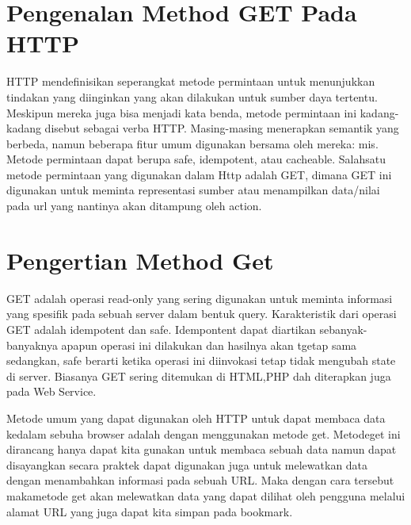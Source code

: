 
\section{Pengenalan Method GET Pada HTTP}
HTTP mendefinisikan seperangkat metode permintaan untuk menunjukkan tindakan yang diinginkan yang akan dilakukan untuk sumber daya 
tertentu.
Meskipun mereka juga bisa menjadi kata benda, metode permintaan ini kadang-kadang disebut sebagai verba HTTP. Masing-masing menerapkan 
semantik yang berbeda, namun beberapa fitur umum digunakan bersama oleh mereka: mis. Metode permintaan dapat berupa safe, idempotent, atau 
cacheable. 
Salahsatu metode permintaan yang digunakan dalam Http adalah GET, dimana GET ini digunakan untuk meminta representasi sumber atau 
menampilkan data/nilai pada url yang nantinya akan ditampung oleh action.

\section{Pengertian Method Get}
GET adalah operasi read-only yang sering digunakan untuk meminta informasi yang spesifik pada sebuah server dalam bentuk query. 
Karakteristik dari operasi GET adalah idempotent dan safe. Idempontent dapat diartikan sebanyak-banyaknya apapun operasi ini dilakukan dan 
hasilnya akan tgetap sama sedangkan, safe berarti ketika operasi ini diinvokasi tetap tidak mengubah state di server.
Biasanya GET sering ditemukan di HTML,PHP dah diterapkan juga pada Web Service.

Metode umum yang dapat digunakan oleh HTTP untuk dapat membaca data kedalam sebuha browser adalah dengan menggunakan metode get. Metodeget 
ini dirancang hanya dapat kita gunakan untuk membaca sebuah data namun dapat disayangkan secara praktek dapat digunakan juga untuk 
melewatkan data dengan menambahkan informasi pada sebuah URL. Maka dengan cara tersebut makametode get akan melewatkan data yang dapat 
dilihat oleh pengguna melalui alamat URL yang juga dapat kita simpan pada bookmark.
